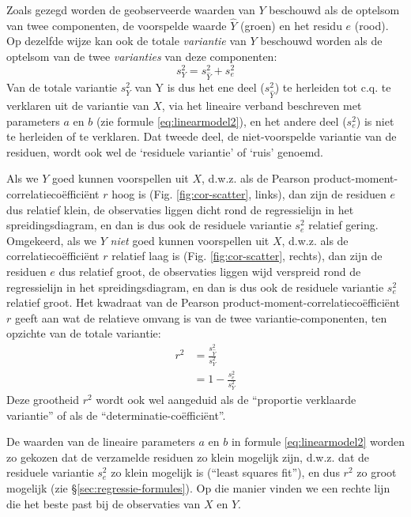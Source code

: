 \documentclass[
]{book}
\begin{document}
Zoals gezegd worden de geobserveerde waarden van \(Y\) beschouwd als de
optelsom van twee componenten, de voorspelde waarde \(\widehat{Y}\)
(groen) en het residu \(e\) (rood). Op dezelfde wijze kan ook de totale
\emph{variantie} van \(Y\) beschouwd worden als de optelsom van de twee
\emph{varianties} van deze componenten:
\begin{equation}
    s^2_{Y} = s^2_{\widehat{Y}} + s^2_e
  \label{eq:variance-pred-res}
\end{equation}
Van de totale variantie
\(s^2_Y\) van Y is dus het ene deel (\(s^2_{\widehat{Y}}\)) te herleiden tot
c.q. te verklaren uit de variantie van \(X\), via het lineaire verband
beschreven met parameters \(a\) en \(b\) (zie
formule \eqref{eq:linearmodel2}), en het andere deel (\(s^2_e\)) is niet te
herleiden of te verklaren. Dat tweede deel, de niet-voorspelde variantie
van de residuen, wordt ook wel de `residuele variantie' of `ruis'
genoemd.

Als we \(Y\) goed kunnen voorspellen uit \(X\), d.w.z. als de Pearson
product-moment-correlatiecoëfficiënt \(r\) hoog is
(Fig. \ref{fig:cor-scatter}, links), dan zijn de residuen \(e\) dus
relatief klein, de observaties liggen dicht rond de regressielijn in het
spreidingsdiagram, en dan is dus ook de residuele variantie \(s^2_e\)
relatief gering. Omgekeerd, als we \(Y\) \emph{niet} goed kunnen voorspellen
uit \(X\), d.w.z. als de correlatiecoëfficiënt \(r\) relatief laag is
(Fig. \ref{fig:cor-scatter}, rechts), dan zijn de residuen \(e\) dus
relatief groot, de observaties liggen wijd verspreid rond de
regressielijn in het spreidingsdiagram, en dan is dus ook de residuele
variantie \(s^2_e\) relatief groot. Het kwadraat van de Pearson
product-moment-correlatiecoëfficiënt \(r\) geeft aan wat de relatieve
omvang is van de twee variantie-componenten, ten opzichte van de totale
variantie:
\begin{align}
    r^2 & = \frac{s^2_{\widehat{Y}}}{s^2_Y} \\
        & = 1 - \frac{s^2_e}{s^2_Y}
  \label{eq:r2}
\end{align}
Deze grootheid \(r^2\) wordt ook wel aangeduid als de
``proportie verklaarde variantie'' of als de ``determinatie-coëfficiënt''.

De waarden van de lineaire parameters \(a\) en \(b\) in
formule \eqref{eq:linearmodel2} worden zo gekozen dat de verzamelde
residuen zo klein mogelijk zijn, d.w.z. dat de residuele variantie
\(s^2_e\) zo klein mogelijk is (``least squares fit''), en dus \(r^2\) zo
groot mogelijk (zie
§\ref{sec:regressie-formules}). Op die manier vinden we een rechte
lijn die het beste past bij de observaties van \(X\) en \(Y\).
\end{document}
